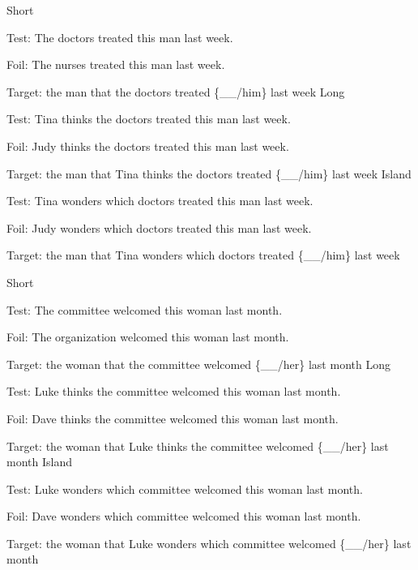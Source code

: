 \pex %
\a Short\par\nobreak
Test: The doctors treated this man last week.\par\nobreak
Foil: The nurses treated this man last week.\par\nobreak
Target: the man that the doctors treated \{\_\_/him\} last week
\a Long\par\nobreak
Test: Tina thinks the doctors treated this man last week.\par\nobreak
Foil: Judy thinks the doctors treated this man last week.\par\nobreak
Target: the man that Tina thinks the doctors treated \{\_\_/him\} last week
\a Island\par\nobreak
Test: Tina wonders which doctors treated this man last week.\par\nobreak
Foil: Judy wonders which doctors treated this man last week.\par\nobreak
Target: the man that Tina wonders which doctors treated \{\_\_/him\} last week
\xe

\pex %
\a Short\par\nobreak
Test: The committee welcomed this woman last month.\par\nobreak
Foil: The organization welcomed this woman last month.\par\nobreak
Target: the woman that the committee welcomed \{\_\_/her\} last month
\a Long\par\nobreak
Test: Luke thinks the committee welcomed this woman last month.\par\nobreak
Foil: Dave thinks the committee welcomed this woman last month.\par\nobreak
Target: the woman that Luke thinks the committee welcomed \{\_\_/her\} last month
\a Island\par\nobreak
Test: Luke wonders which committee welcomed this woman last month.\par\nobreak
Foil: Dave wonders which committee welcomed this woman last month.\par\nobreak
Target: the woman that Luke wonders which committee welcomed \{\_\_/her\} last month
\xe

